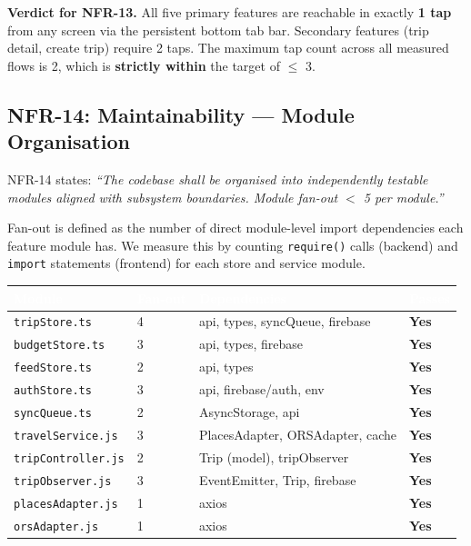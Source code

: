 \documentclass[12pt, a4paper]{article}
\newcommand{\thcell}[1]{\textcolor{white}{\textbf{\small #1}}}
\newcommand{\code}[1]{\texttt{\small #1}}
\newcommand{\reqid}[1]{\textsc{\small #1}}
\begin{document}
\begin{tcolorbox}[notebox]
  \textbf{Verdict for NFR-13.} All five primary features are reachable in exactly \textbf{1 tap} from any screen via the persistent bottom tab bar. Secondary features (trip detail, create trip) require 2 taps. The maximum tap count across all measured flows is 2, which is \textbf{strictly within} the target of $\leq$ 3.
\end{tcolorbox}

\subsection{NFR-14: Maintainability --- Module Organisation}

\reqid{NFR-14} states: \emph{``The codebase shall be organised into independently testable modules aligned with subsystem boundaries. Module fan-out $<$ 5 per module.''}

Fan-out is defined as the number of direct module-level import dependencies each feature module has. We measure this by counting \code{require()} calls (backend) and \code{import} statements (frontend) for each store and service module.

\begin{longtable}{L{4.5cm} C{1.5cm} L{5.5cm} C{1.5cm}}
\toprule
{}
\thcell{Module} & \thcell{Fan-out} & \thcell{Dependencies} & \thcell{Passes} \\
\midrule
\endhead
\bottomrule
\endfoot

\code{tripStore.ts} & 4 & api, types, syncQueue, firebase & \textbf{Yes} \\
\code{budgetStore.ts} & 3 & api, types, firebase & \textbf{Yes} \\
\code{feedStore.ts} & 2 & api, types & \textbf{Yes} \\
\code{authStore.ts} & 3 & api, firebase/auth, env & \textbf{Yes} \\
\code{syncQueue.ts} & 2 & AsyncStorage, api & \textbf{Yes} \\
\code{travelService.js} & 3 & PlacesAdapter, ORSAdapter, cache & \textbf{Yes} \\
\code{tripController.js} & 2 & Trip (model), tripObserver & \textbf{Yes} \\
\code{tripObserver.js} & 3 & EventEmitter, Trip, firebase & \textbf{Yes} \\
\code{placesAdapter.js} & 1 & axios & \textbf{Yes} \\
\code{orsAdapter.js} & 1 & axios & \textbf{Yes} \\
\end{longtable}
\end{document}
